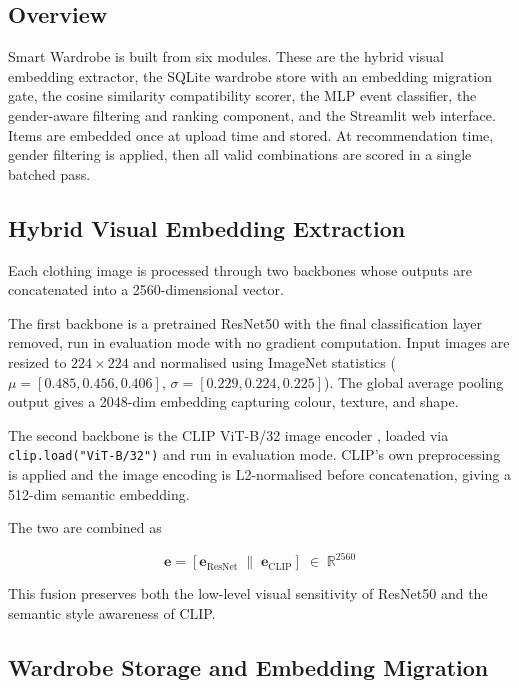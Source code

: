 \documentclass[conference]{IEEEtran}
\begin{document}
\subsection{Overview}

Smart Wardrobe is built from six modules. These are the hybrid visual embedding extractor, the SQLite wardrobe store with an embedding migration gate, the cosine similarity compatibility scorer, the MLP event classifier, the gender-aware filtering and ranking component, and the Streamlit web interface. Items are embedded once at upload time and stored. At recommendation time, gender filtering is applied, then all valid combinations are scored in a single batched pass.

\subsection{Hybrid Visual Embedding Extraction}

Each clothing image is processed through two backbones whose outputs are concatenated into a 2560-dimensional vector.

The first backbone is a pretrained ResNet50 \cite{b1} with the final classification layer removed, run in evaluation mode with no gradient computation. Input images are resized to $224\times224$ and normalised using ImageNet statistics ($\mu=[0.485, 0.456, 0.406]$, $\sigma=[0.229, 0.224, 0.225]$). The global average pooling output gives a 2048-dim embedding capturing colour, texture, and shape.

The second backbone is the CLIP ViT-B/32 image encoder \cite{b8}, loaded via \texttt{clip.load("ViT-B/32")} and run in evaluation mode. CLIP's own preprocessing is applied and the image encoding is L2-normalised before concatenation, giving a 512-dim semantic embedding.

The two are combined as

\begin{equation}
\mathbf{e} = [\mathbf{e}_\text{ResNet} \;\|\; \mathbf{e}_\text{CLIP}] \;\in\; \mathbb{R}^{2560}
\label{eq:hybrid}
\end{equation}

This fusion preserves both the low-level visual sensitivity of ResNet50 and the semantic style awareness of CLIP.

\subsection{Wardrobe Storage and Embedding Migration}
\end{document}
